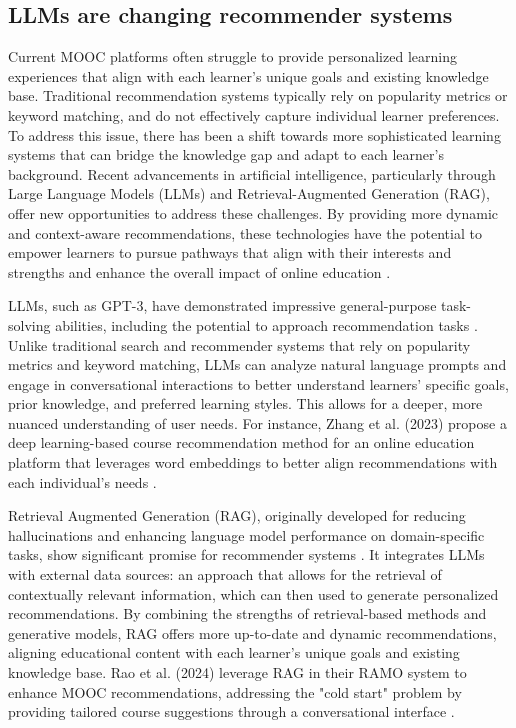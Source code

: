 \subsection{LLMs are changing recommender systems}

Current MOOC platforms often struggle to provide personalized learning experiences that align with each learner's unique goals and existing knowledge base. Traditional recommendation systems typically rely on popularity metrics or keyword matching, and do not effectively capture individual learner preferences. To address this issue, there has been a shift towards more sophisticated learning systems that can bridge the knowledge gap and adapt to each learner’s background. Recent advancements in artificial intelligence, particularly through Large Language Models (LLMs) and Retrieval-Augmented Generation (RAG), offer new opportunities to address these challenges. By providing more dynamic and context-aware recommendations, these technologies have the potential to empower learners to pursue pathways that align with their interests and strengths and enhance the overall impact of online education \cite{khalid_recommender_2020}. 

LLMs, such as GPT-3, have demonstrated impressive general-purpose task-solving abilities, including the potential to approach recommendation tasks \cite{noauthor_language_nodate}. Unlike traditional search and recommender systems that rely on popularity metrics and keyword matching, LLMs can analyze natural language prompts and engage in conversational interactions to better understand learners’ specific goals, prior knowledge, and preferred learning styles. This allows for a deeper, more nuanced understanding of user needs. For instance, Zhang et al. (2023) propose a deep learning-based course recommendation method for an online education platform that leverages word embeddings to better align recommendations with each individual’s needs \cite{zhang_personalized_2023}. 

Retrieval Augmented Generation (RAG), originally developed for reducing hallucinations and enhancing language model performance on domain-specific tasks, show significant promise for recommender systems \cite{noauthor_retrieval}. It integrates LLMs with external data sources: an approach that allows for the retrieval of contextually relevant information, which can then used to generate personalized recommendations. By combining the strengths of retrieval-based methods and generative models, RAG offers more up-to-date and dynamic recommendations, aligning educational content with each learner's unique goals and existing knowledge base. Rao et al. (2024) leverage RAG in their RAMO system to enhance MOOC recommendations, addressing the "cold start" problem by providing tailored course suggestions through a conversational interface \cite{rao_ramo_2024}.

